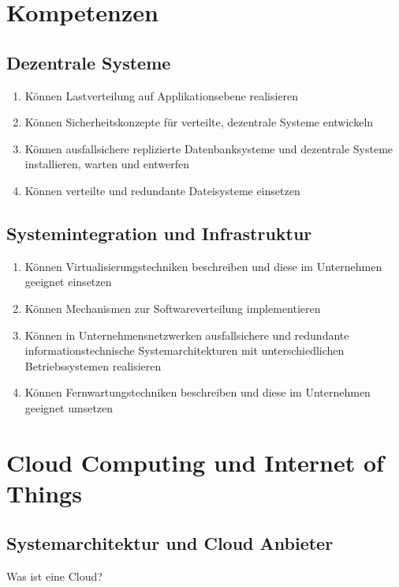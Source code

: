 
\section{Kompetenzen}
\label{sec:Kompetenzen}
\subsection{Dezentrale Systeme}
\label{subsec:Dezentrale Systeme}
\begin{enumerate}
\item Können Lastverteilung auf
Applikationsebene realisieren
\item Können Sicherheitskonzepte für
verteilte, dezentrale Systeme
entwickeln
\item Können ausfallsichere replizierte Datenbanksysteme und dezentrale Systeme installieren, warten und entwerfen
\item Können verteilte und redundante
Dateisysteme einsetzen
\end{enumerate}

\subsection{Systemintegration und Infrastruktur}
\label{subsec:Systemintegration und Infrastruktur}
\begin{enumerate}
\item Können
Virtualisierungstechniken
beschreiben und diese im
Unternehmen geeignet einsetzen
\item Können Mechanismen zur
Softwareverteilung
implementieren
\item Können in Unternehmensnetzwerken ausfallsichere und redundante informationstechnische Systemarchitekturen mit unterschiedlichen Betriebssystemen realisieren
\item Können Fernwartungstechniken
beschreiben und diese im
Unternehmen geeignet umsetzen
\end{enumerate}

\section{Cloud Computing und Internet of Things}
\label{sec:Cloud Computing und Internet of Things}
\subsection{Systemarchitektur und Cloud Anbieter}
\label{subsec:Systemarchitektur und Cloud Anbieter}
Was ist eine Cloud?

